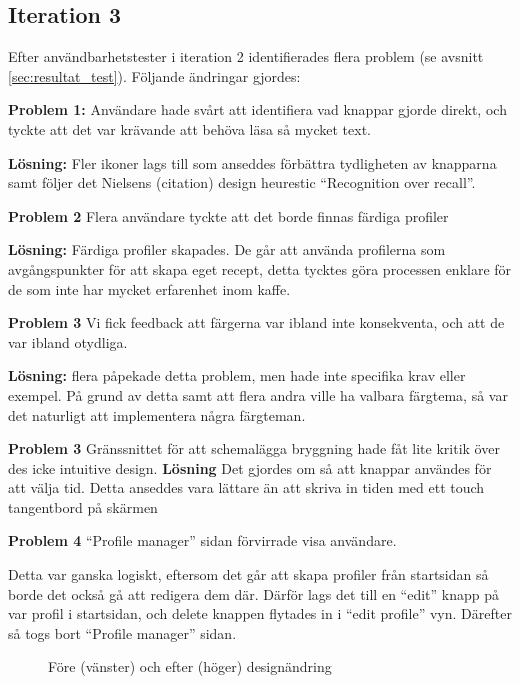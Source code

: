 
\subsection{Iteration 3}

Efter användbarhetstester i iteration 2 identifierades flera problem (se avsnitt \ref{sec:resultat_test}). Följande ändringar gjordes:

\textbf{Problem 1:} Användare hade svårt att identifiera vad knappar gjorde direkt, och tyckte att det var krävande att behöva läsa så mycket text.  

\textbf{Lösning:} Fler ikoner lags till som anseddes förbättra tydligheten av knapparna samt följer det Nielsens (citation) design heurestic “Recognition over recall”. 

\textbf{Problem 2} Flera användare tyckte att det borde finnas färdiga profiler 

 \textbf{Lösning:} Färdiga profiler skapades. De går att använda profilerna som avgångspunkter för att skapa eget recept, detta tycktes göra processen enklare för de som inte har mycket erfarenhet inom kaffe.  

 \textbf{Problem 3} Vi fick feedback att färgerna var ibland inte konsekventa, och att de var ibland otydliga.  

\textbf{Lösning:}  flera påpekade detta problem, men hade inte specifika krav eller exempel. På grund av detta samt att flera andra ville ha valbara färgtema, så var det naturligt att implementera några färgteman.   

\textbf{Problem 3} Gränssnittet för att schemalägga bryggning hade fåt lite kritik över des icke intuitive design. 
\textbf{Lösning} Det gjordes om så att knappar användes för att välja tid. Detta anseddes vara lättare än att skriva in tiden med ett touch tangentbord på skärmen  

 \textbf{Problem 4} “Profile manager” sidan förvirrade visa användare.  

Detta var ganska logiskt, eftersom det går att skapa profiler från startsidan så borde det också gå att redigera dem där. Därför lags det till en “edit” knapp  på var profil i startsidan, och delete knappen flytades in i “edit profile” vyn.  Därefter så togs bort “Profile manager” sidan.  


\begin{figure}[ht]
    \centering
    \caption{Före (vänster) och efter (höger) designändring}
    \label{fig:forbattring1}
\end{figure}

